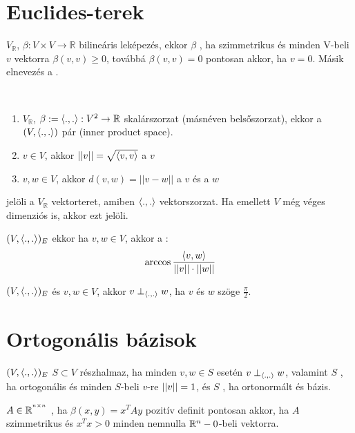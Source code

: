 \section{Euclides-terek}
\begin{ff}
	$V_{\mathbb{R}}$, $\beta:V\times V\to \mathbb{R}$ bilineáris leképezés,
	ekkor $\beta$ , ha szimmetrikus és minden V-beli
	$v$ vektorra $\beta(v,v)\ge 0$, továbbá $\beta(v,v)=0$ pontosan akkor,
	ha $v=0$. Másik elnevezés a .
\end{ff}

\begin{ff}
	~\begin{enumerate}
		\item $V_{\mathbb{R}}$, $\beta:=\langle.,.\rangle:V^2\to \mathbb{R}$
			skalárszorzat (másnéven belsőszorzat), ekkor a $(V,\langle.,.\rangle)$ pár
			 (inner product space).
		\item $v\in V$, akkor $||v||=\sqrt{\langle v,v\rangle}$ a $v$ 
		\item $v,w\in V$, akkor $d(v,w)=||v-w||$ a $v$ és a $w$ 
	\end{enumerate}
\end{ff}
\begin{jel}
	 jelöli a $V_\mathbb{R}$ vektorteret, amiben $\langle.,.\rangle$ 
	vektorszorzat. Ha emellett $V$ még véges dimenziós is, akkor ezt
	 jelöli.
\end{jel}
\begin{ff}
	$(V,\langle.,.\rangle)_E$ ekkor ha $v,w\in V$, akkor a :
	\begin{equation*}
		\arccos\frac{\langle v,w\rangle}{||v||\cdot||w||}
	\end{equation*}
\end{ff}
\begin{ff}
	$(V,\langle.,.\rangle)_E$ és $v,w\in V$, akkor $v\perp_{\langle.,.\rangle}w$, ha $v$ és $w$ szöge $\frac{\pi}{2}$.
\end{ff}

\section{Ortogonális bázisok}
\begin{ff}
	$(V,\langle.,.\rangle)_E$ $S\subset V$  részhalmaz, ha minden $v,w\in S$ 
	esetén $v\perp_{\langle.,.\rangle}w$, valamint $S$ , ha
	ortogonális és minden $S$-beli $v$-re $||v||=1$, és $S$
	, ha ortonormált és bázis.
\end{ff}
\begin{ff}
	$A\in\mathbb{R}^{^{n\times n}}$ , ha $\beta(x,y)=x^TAy$
	pozitív definit pontosan akkor, ha $A$ szimmetrikus és $x^Tx>0$ minden
	nemnulla $\mathbb{R}^n-{0}$-beli vektorra.
\end{ff}

